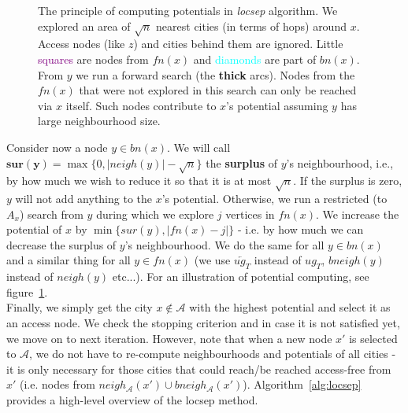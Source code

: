 		\begin{figure}[h!]
			\begin{center}
			\end{center}
			\caption{\label{fig:locsep} The principle of computing potentials in \textit{locsep} algorithm. We explored an area of $\sqrt{n}$ nearest cities (in terms of hops) around $x$. Access nodes (like $z$) and cities behind them are ignored. Little \textcolor{purple}{squares} are nodes from $fn(x)$ and \textcolor{cyan}{diamonds} are part of $bn(x)$. From $y$ we run a forward search (the \textbf{thick} arcs). Nodes from the $fn(x)$ that were not explored in this search can only be reached via $x$ itself. Such nodes contribute to $x$'s potential assuming $y$ has large neighbourhood size.}
		\end{figure}				
				
		\noindent Consider now a node $y \in bn(x)$. We will call $\bm{sur(y)} = \max\{0, |neigh(y)| - \sqrt{n}\}$ the \textbf{surplus} of $y$'s neighbourhood, i.e., by how much we wish to reduce it so that it is at most $\sqrt{n}$. If the surplus is zero, $y$ will not add anything to the $x$'s potential. Otherwise, we run a restricted (to $A_{x}$) search from $y$ during which we explore $j$ vertices in $fn(x)$. We increase the potential of $x$ by $\min\{sur(y), |fn(x) - j|\}$ - i.e. by how much we can decrease the surplus of $y$'s neighbourhood. We do the same for all $y \in bn(x)$ and a similar thing for all $y \in fn(x)$ (we use $\overleftarrow{ug_{T}}$ instead of $ug_{T}$, $bneigh(y)$ instead of $neigh(y)$ etc...). For an illustration of potential computing, see figure~\ref{fig:locsep}. \\

		\noindent Finally, we simply get the city $x \not \in \mathcal{A}$ with the highest potential and select it as an access node. We check the stopping criterion and in case it is not satisfied yet, we move on to next iteration. However, note that when a new node $x'$ is selected to $\mathcal{A}$, we do not have to re-compute neighbourhoods and potentials of all cities - it is only necessary for those cities that could reach/be reached access-free from $x'$ (i.e. nodes from $neigh_{\mathcal{A}}(x') \cup bneigh_{\mathcal{A}}(x')$). Algorithm~\ref{alg:locsep} provides a high-level overview of the locsep method. \\
		
